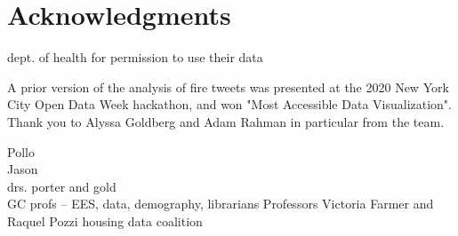 \part*{Acknowledgments}

dept. of health for permission to use their data 


A prior version of the analysis of fire tweets was presented at the 2020 New York City Open Data Week hackathon, and won "Most Accessible Data Visualization". Thank you to Alyssa Goldberg and Adam Rahman in particular from the team. 

Pollo\\
Jason\\
drs. porter and gold\\
GC profs -- EES, data, demography, librarians
Professors Victoria Farmer and Raquel Pozzi
housing data coalition
